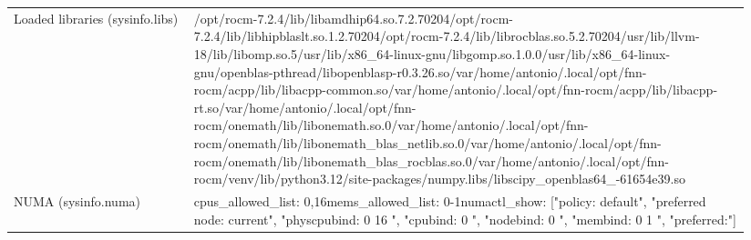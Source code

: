 \begin{longtable}{>{\raggedright\arraybackslash}p{0.23\linewidth}>{\raggedright\arraybackslash}p{0.71\linewidth}}
Loaded libraries (sysinfo.libs) & /\allowbreak{}opt/\allowbreak{}rocm-7.2.4/\allowbreak{}lib/\allowbreak{}libamdhip64.so.7.2.70204\newline /\allowbreak{}opt/\allowbreak{}rocm-7.2.4/\allowbreak{}lib/\allowbreak{}libhipblaslt.so.1.2.70204\newline /\allowbreak{}opt/\allowbreak{}rocm-7.2.4/\allowbreak{}lib/\allowbreak{}librocblas.so.5.2.70204\newline /\allowbreak{}usr/\allowbreak{}lib/\allowbreak{}llvm-18/\allowbreak{}lib/\allowbreak{}libomp.so.5\newline /\allowbreak{}usr/\allowbreak{}lib/\allowbreak{}x86\_\allowbreak{}64-linux-gnu/\allowbreak{}libgomp.so.1.0.0\newline /\allowbreak{}usr/\allowbreak{}lib/\allowbreak{}x86\_\allowbreak{}64-linux-gnu/\allowbreak{}openblas-pthread/\allowbreak{}libopenblasp-r0.3.26.so\newline /\allowbreak{}var/\allowbreak{}home/\allowbreak{}antonio/\allowbreak{}.local/\allowbreak{}opt/\allowbreak{}fnn-rocm/\allowbreak{}acpp/\allowbreak{}lib/\allowbreak{}libacpp-common.so\newline /\allowbreak{}var/\allowbreak{}home/\allowbreak{}antonio/\allowbreak{}.local/\allowbreak{}opt/\allowbreak{}fnn-rocm/\allowbreak{}acpp/\allowbreak{}lib/\allowbreak{}libacpp-rt.so\newline /\allowbreak{}var/\allowbreak{}home/\allowbreak{}antonio/\allowbreak{}.local/\allowbreak{}opt/\allowbreak{}fnn-rocm/\allowbreak{}onemath/\allowbreak{}lib/\allowbreak{}libonemath.so.0\newline /\allowbreak{}var/\allowbreak{}home/\allowbreak{}antonio/\allowbreak{}.local/\allowbreak{}opt/\allowbreak{}fnn-rocm/\allowbreak{}onemath/\allowbreak{}lib/\allowbreak{}libonemath\_\allowbreak{}blas\_\allowbreak{}netlib.so.0\newline /\allowbreak{}var/\allowbreak{}home/\allowbreak{}antonio/\allowbreak{}.local/\allowbreak{}opt/\allowbreak{}fnn-rocm/\allowbreak{}onemath/\allowbreak{}lib/\allowbreak{}libonemath\_\allowbreak{}blas\_\allowbreak{}rocblas.so.0\newline /\allowbreak{}var/\allowbreak{}home/\allowbreak{}antonio/\allowbreak{}.local/\allowbreak{}opt/\allowbreak{}fnn-rocm/\allowbreak{}venv/\allowbreak{}lib/\allowbreak{}python3.12/\allowbreak{}site-packages/\allowbreak{}numpy.libs/\allowbreak{}libscipy\_\allowbreak{}openblas64\_\allowbreak{}-61654e39.so \\
NUMA (sysinfo.numa) & cpus\_\allowbreak{}allowed\_\allowbreak{}list: 0,16\newline mems\_\allowbreak{}allowed\_\allowbreak{}list: 0-1\newline numactl\_\allowbreak{}show: ["policy: default", "preferred node: current", "physcpubind: 0 16 ", "cpubind: 0 ", "nodebind: 0 ", "membind: 0 1 ", "preferred:"] \\

\end{longtable}
